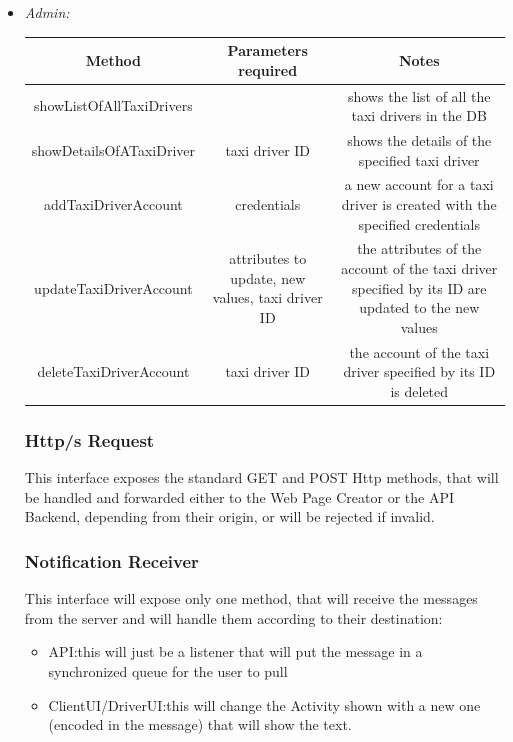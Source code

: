 \documentclass{article}
\begin{document}
\begin{itemize}
\begin{table}[H]
\begin{adjustbox}{width=1.2\textwidth}
\begin{tabular}{*{3}{c}}
				\bottomrule
			\end{tabular}
		\end{adjustbox}
	\end{table}		
	\item \textit{Admin:} \\
	\begin{table}[H]
		\begin{adjustbox}{width=1.2\textwidth}	
			\begin{tabular}{*{3}{c}}
				\toprule
				Method & Parameters required & Notes \\
				\midrule
				showListOfAllTaxiDrivers & & shows the list of all the taxi drivers in the DB\\
				showDetailsOfATaxiDriver & taxi driver ID & shows the details of the specified taxi driver\\
				addTaxiDriverAccount & credentials & a new account for a taxi driver is created with the specified credentials\\ 
				updateTaxiDriverAccount & attributes to update, new values, taxi driver ID & the attributes of the account of the taxi driver specified by its ID are updated to the new values\\ 
				deleteTaxiDriverAccount & taxi driver ID & the account of the taxi driver specified by its ID is deleted\\
				\bottomrule
			\end{tabular}
		\end{adjustbox}	
	\end{table}	
\subsubsection{Http/s Request} 
This interface exposes the standard GET and POST Http methods, that will be handled and forwarded either to the Web Page Creator or the API Backend, depending from their origin, or will be rejected if invalid.
\subsubsection{Notification Receiver}
This interface will expose only one method, that will receive the messages from the server and will handle them according to their destination: 
	\begin{itemize}
		\item API:\@ this will just be a listener that will put the message in a synchronized queue for the user to pull
		\item ClientUI/DriverUI:\@ this will change the Activity shown with a new one (encoded in the message) that will show the text. %
\end{itemize}
		

\end{itemize}
\end{document}

